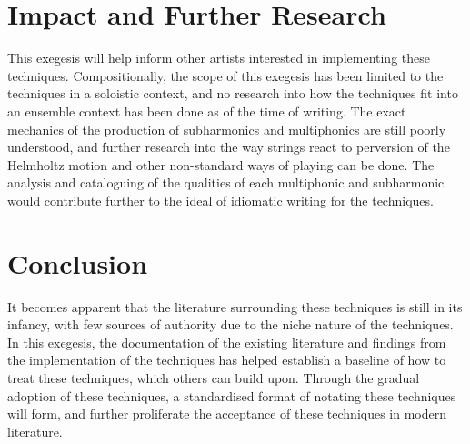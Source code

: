 \section{Impact and Further Research}
This exegesis will help inform other artists interested in implementing these techniques. 
Compositionally, the scope of this exegesis has been limited to the techniques in a soloistic context, and no research into how the techniques fit into an ensemble context has been done as of the time of writing.
The exact mechanics of the production of \hyperref[sec:subharmonics]{subharmonics} and \hyperref[sec:multiphonics]{multiphonics} are still poorly understood, and further research into the way strings react to perversion of the Helmholtz motion and other non-standard ways of playing can be done.
The analysis and cataloguing of the qualities of each multiphonic and subharmonic would contribute further to the ideal of idiomatic writing for the techniques.


\section{Conclusion}
It becomes apparent that the literature surrounding these techniques is still in its infancy, with few sources of authority due to the niche nature of the techniques.
In this exegesis, the documentation of the existing literature and findings from the implementation of the techniques has helped establish a baseline of how to treat these techniques, which others can build upon.
Through the gradual adoption of these techniques, a standardised format of notating these techniques will form, and further proliferate the acceptance of these techniques in modern literature.

